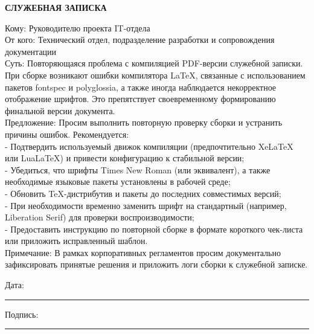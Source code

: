 \documentclass[12pt]{article}
\begin{document}
\begin{center}
\textbf{\LARGE СЛУЖЕБНАЯ ЗАПИСКА}
\end{center}

\vspace{1cm}

Кому: Руководителю проекта IT-отдела\\
От кого: Технический отдел, подразделение разработки и сопровождения документации\\
Суть: Повторяющаяся проблема с компиляцией PDF-версии служебной записки. При сборке возникают ошибки компилятора LaTeX, связанные с использованием пакетов fontspec и polyglossia, а также иногда наблюдается некорректное отображение шрифтов. Это препятствует своевременному формированию финальной версии документа.\\
Предложение: Просим выполнить повторную проверку сборки и устранить причины ошибок. Рекомендуется: \\
- Подтвердить используемый движок компиляции (предпочтительно XeLaTeX или LuaLaTeX) и привести конфигурацию к стабильной версии;\\
- Убедиться, что шрифты Times New Roman (или эквивалент), а также необходимые языковые пакеты установлены в рабочей среде;\\
- Обновить TeX-дистрибутив и пакеты до последних совместимых версий;\\
- При необходимости временно заменить шрифт на стандартный (например, Liberation Serif) для проверки воспроизводимости;\\
- Предоставить инструкцию по повторной сборке в формате короткого чек-листа или приложить исправленный шаблон.\\
Примечание: В рамках корпоративных регламентов просим документально зафиксировать принятые решения и приложить логи сборки к служебной записке.

\vfill

\noindent
Дата: \rule{5cm}{0.4pt} \hfill Подпись: \rule{5cm}{0.4pt}
\end{document}
